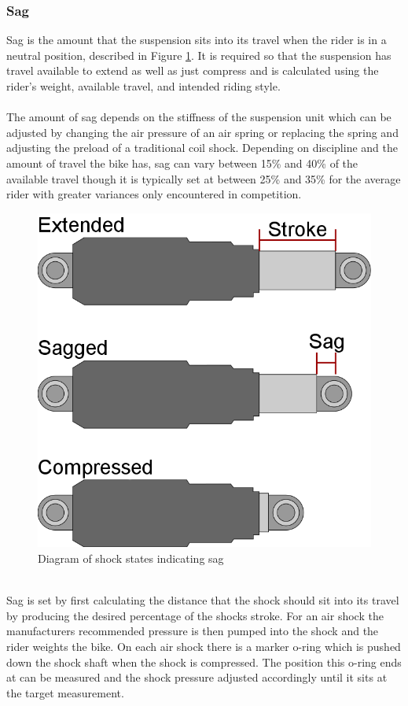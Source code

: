 	\subsubsection{Sag} \label{sec:sag}
		Sag is the amount that the suspension sits into its travel when the rider is in a neutral position, described in Figure \ref{fig:sag}. It is required so that the suspension has travel available to extend as well as just compress and is calculated using the rider’s weight, available travel, and intended riding style.
		\\\\
		The amount of sag depends on the stiffness of the suspension unit which can be adjusted by changing the air pressure of an air spring or replacing the spring and adjusting the preload of a traditional coil shock. Depending on discipline and the	amount of travel the bike has, sag can vary between 15\% and 40\% of the available travel though it is typically set at between 25\% and 35\% for the average rider with greater variances only encountered in competition.
		\begin{figure}[h!]
			\centering
			\includegraphics[scale=0.5]{../images/sag_diagram.png}
			\caption{Diagram of shock states indicating sag}
			\label{fig:sag}
		\end{figure}
		\\
		Sag is set by first calculating the distance that the shock should sit into its travel by producing the desired percentage of the shocks stroke. For an air shock the manufacturers recommended pressure is then pumped into the shock and the rider weights the bike. On each air shock there is a marker o-ring which is pushed down the shock shaft when the shock is compressed. The position this o-ring ends at can be measured and the shock pressure adjusted accordingly until it sits at the target measurement. 
